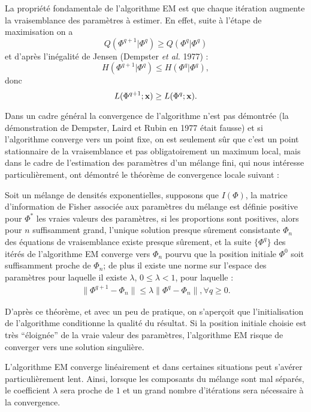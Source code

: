 La propri\'et\'e fondamentale de l'algorithme EM est que chaque 
it\'eration augmente la vraisemblance des param\`etres \`a estimer. 
En effet, suite \`a l'\'etape de maximisation on a
\[
Q(\Phi^{q+1} | \Phi^q) \geq Q(\Phi^{q} | \Phi^q)
\]
 et d'apr\`es 
l'in\'egalit\'e de Jensen (Dempster {\em et al.} 1977)  :
\[H(\Phi^{q+1} | \Phi^q) \leq H(\Phi^{q} | \Phi^q),\] 
donc 
\[L(\Phi^{q+1};\mbox{\bf x}) \geq L(\Phi^{q};\mbox{\bf x}).\]


Dans un cadre g\'en\'eral la convergence de
l'algorithme n'est pas d\'emontr\'ee (la d\'emonstration de Dempster, Laird
et Rubin en 1977 \'etait fausse) et si l'algorithme converge vers un point
fixe, on est seulement s\^ur que c'est un point stationnaire de la vraisemblance
et pas obligatoirement un maximum local, mais dans le cadre de l'estimation
des param\`etres d'un m\'elange fini,
qui nous int\'eresse particuli\`erement, 
ont d\'emontr\'e le th\'eor\`eme de convergence locale suivant :
\begin{th}\cite{Redner1984}
Soit un m\'elange de densit\'es exponentielles,
supposons que $I(\Phi)$, la matrice d'information de Fisher associ\'ee aux
param\`etres du m\'elange est d\'efinie positive pour $\Phi^*$ les vraies
valeurs des param\`etres, si les proportions sont positives, alors pour
$n$ suffisamment grand, l'unique solution presque s\^urement consistante
$\Phi_n$ des \'equations de vraisemblance existe presque s\^urement, et
la suite $\{ \Phi^q \}$ des it\'er\'es de l'algorithme EM converge vers $\Phi_n$
pourvu que la position initiale $\Phi^0$ soit suffisamment proche de $\Phi_n$;
de plus il existe une norme sur l'espace des param\`etres pour laquelle
il existe $\lambda$, $0\leq \lambda <1$, pour laquelle :
\begin{eqnarray*}
\|\Phi^{q+1}- \Phi_n\| \leq \lambda \|  \Phi^{q}- \Phi_n \|, \forall q \geq 0.
\end{eqnarray*}
\end{th}


D'apr\`es ce th\'eor\`eme, et avec un peu de pratique, on s'aper\c{c}oit que
l'initialisation de l'algorithme conditionne la qualit\'e du r\'esultat.
Si la position initiale choisie est tr\`es ``\'eloign\'ee'' de la vraie
valeur des param\`etres, l'algorithme EM risque de converger vers une
solution singuli\`ere.

L'algorithme EM converge  lin\'eairement et dans certaines situations peut
s'av\'erer particuli\`erement lent. Ainsi, lorsque les composants du
m\'elange sont mal s\'epar\'es, le coefficient $\lambda$ sera proche
de $1$ et un grand nombre d'it\'erations sera n\'ecessaire \`a la convergence.

